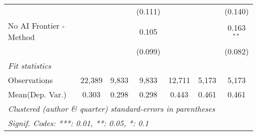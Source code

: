 \begin{tabular}{lcccccc}
                           &               &               & (0.111)       &               &               & (0.140)\\   
   No AI Frontier - Method &               &               & 0.105         &               &               & 0.163$^{**}$\\   
                           &               &               & (0.099)       &               &               & (0.082)\\   
   \midrule
   \emph{Fit statistics}\\
   Observations            & 22,389        & 9,833         & 9,833         & 12,711        & 5,173         & 5,173\\  
Mean(Dep. Var.) & 0.303 & 0.298 & 0.298 & 0.443 & 0.461 & 0.461 \\
   \midrule \midrule
   \multicolumn{7}{l}{\emph{Clustered (author \& quarter) standard-errors in parentheses}}\\
   \multicolumn{7}{l}{\emph{Signif. Codes: ***: 0.01, **: 0.05, *: 0.1}}\\
\end{tabular}
\par\endgroup
